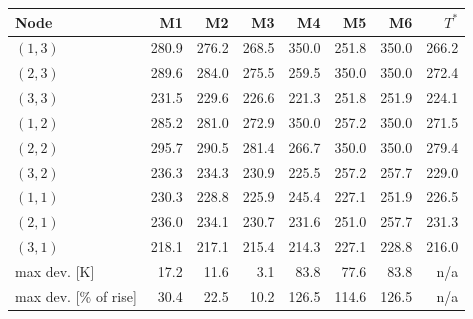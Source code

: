 \begin{tabular}{@{}l rrrrrr r@{}}
\toprule
Node & M1 & M2 & M3 & M4 & M5 & M6 & $T^*$ \\
\midrule
$(1,3)$ & 280.9 & 276.2 & 268.5 & 350.0 & 251.8 & 350.0 & 266.2 \\
$(2,3)$ & 289.6 & 284.0 & 275.5 & 259.5 & 350.0 & 350.0 & 272.4 \\
$(3,3)$ & 231.5 & 229.6 & 226.6 & 221.3 & 251.8 & 251.9 & 224.1 \\
$(1,2)$ & 285.2 & 281.0 & 272.9 & 350.0 & 257.2 & 350.0 & 271.5 \\
$(2,2)$ & 295.7 & 290.5 & 281.4 & 266.7 & 350.0 & 350.0 & 279.4 \\
$(3,2)$ & 236.3 & 234.3 & 230.9 & 225.5 & 257.2 & 257.7 & 229.0 \\
$(1,1)$ & 230.3 & 228.8 & 225.9 & 245.4 & 227.1 & 251.9 & 226.5 \\
$(2,1)$ & 236.0 & 234.1 & 230.7 & 231.6 & 251.0 & 257.7 & 231.3 \\
$(3,1)$ & 218.1 & 217.1 & 215.4 & 214.3 & 227.1 & 228.8 & 216.0 \\
\midrule
max dev. [K] & 17.2 & 11.6 & 3.1 & 83.8 & 77.6 & 83.8 & n/a \\
max dev. [\% of rise] & 30.4 & 22.5 & 10.2 & 126.5 & 114.6 & 126.5 & n/a \\
\bottomrule
\end{tabular}
